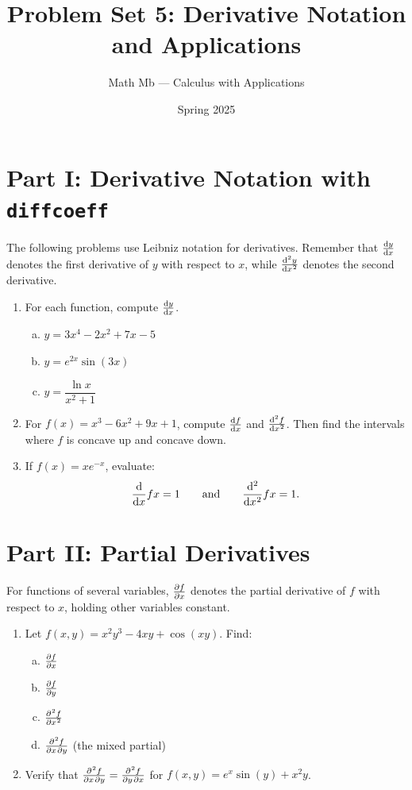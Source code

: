 \documentclass[11pt]{article}
\title{Problem Set 5: Derivative Notation and Applications}
\author{Math Mb --- Calculus with Applications}
\date{Spring 2025}
\begin{document}
\maketitle

\section*{Part I: Derivative Notation with \texttt{diffcoeff}}

The following problems use Leibniz notation for derivatives. Remember that $\diff{y}{x}$ denotes the first derivative of $y$ with respect to $x$, while $\diff[2]{y}{x}$ denotes the second derivative.

\begin{enumerate}
\item For each function, compute $\diff{y}{x}$.
\begin{enumerate}[(a)]
  \item $y = 3x^4 - 2x^2 + 7x - 5$
  \item $y = e^{2x} \sin(3x)$
  \item $y = \dfrac{\ln x}{x^2 + 1}$
\end{enumerate}

\item For $f(x) = x^3 - 6x^2 + 9x + 1$, compute $\diff{f}{x}$ and $\diff[2]{f}{x}$. Then find the intervals where $f$ is concave up and concave down.

\item If $f(x) = x e^{-x}$, evaluate:
\[
  \diff*{f}{x}{x = 1} \qquad \text{and} \qquad \diff*[2]{f}{x}{x = 1}.
\]
\end{enumerate}

\section*{Part II: Partial Derivatives}

For functions of several variables, $\diffp{f}{x}$ denotes the partial derivative of $f$ with respect to $x$, holding other variables constant.

\begin{enumerate}[resume]
\item Let $f(x, y) = x^2 y^3 - 4xy + \cos(xy)$. Find:
\begin{enumerate}[(a)]
  \item $\diffp{f}{x}$
  \item $\diffp{f}{y}$
  \item $\diffp[2]{f}{x}$
  \item $\diffp{f}{x,y}$ \quad (the mixed partial)
\end{enumerate}

\item Verify that $\diffp{f}{x,y} = \diffp{f}{y,x}$ for $f(x, y) = e^{x} \sin(y) + x^2 y$.
\end{enumerate}
\end{document}

